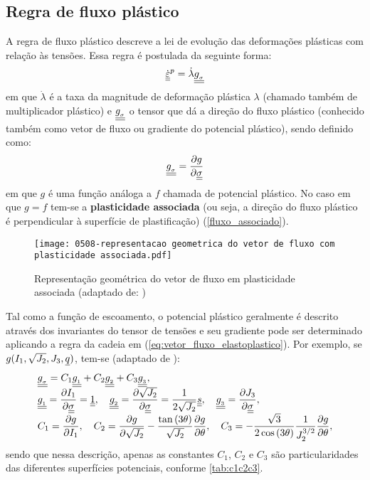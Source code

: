 \subsection{Regra de fluxo plástico}

A regra de fluxo plástico descreve a lei de evolução das deformações plásticas com relação às tensões. Essa regra é postulada da seguinte forma:
\begin{equation}
	\label{eq:fluxo_elastoplastico}
	\dot {\underline{\underline \varepsilon}}^p = \dot \lambda \underline{\underline {g_{_\sigma}}}
\end{equation}
em que $\dot \lambda$ é a taxa da magnitude de deformação plástica $\lambda$ (chamado também de multiplicador plástico) e $\underline{\underline {g_{_\sigma}}}$ o tensor que dá a direção do fluxo plástico (conhecido também como vetor de fluxo ou gradiente do potencial plástico), sendo definido como:
\begin{equation}
	\label{eq:vetor_fluxo_elastoplastico}
	\underline{\underline {g_{_\sigma}}} = \dfrac{\partial g}{\partial \underline{\underline \sigma}}
\end{equation}
em que $g$ é uma função análoga a $f$ chamada de potencial plástico. No caso em que $g=f$ tem-se a \textbf{plasticidade associada} (ou seja, a direção do fluxo plástico é perpendicular à superfície de plastificação) (\autoref{fluxo_associado}).
\begin{figure}[H]
	\begin{center}
		\texttt{[image: 0508-representacao geometrica do vetor de fluxo com plasticidade associada.pdf]}
	\end{center}
	\caption{\label{fluxo_associado}Representação geométrica do vetor de fluxo em plasticidade associada (adaptado de: )}
\end{figure}
Tal como a função de escoamento, o potencial plástico geralmente é descrito através dos invariantes do tensor de tensões e seu gradiente pode ser determinado aplicando a regra da cadeia em (\ref{eq:vetor_fluxo_elastoplastico}). Por exemplo, se $g(I_1,\sqrt{J_2},J_3,\underline q)$, tem-se (adaptado de ):
\begin{equation}
	\label{eq:invariantes_tensores}
	\begin{array}{lcl}
		\underline{\underline {g_{_\sigma}}} = C_1\underline{\underline {g_{_1}}} + C_2\underline{\underline {g_{_2}}} + C_3\underline{\underline {g_{_3}}}, \\ 
		\underline{\underline {g_{_1}}} = \dfrac{\partial I_1}{\partial \underline{\underline \sigma}} = \underline{\underline 1},~~~ \underline{\underline {g_{_2}}} = \dfrac{\partial \sqrt{J_2}}{\partial \underline{\underline \sigma}} = \dfrac{1}{2\sqrt{J_2}}\underline{\underline s},~~~ \underline{\underline {g_{_3}}} = \dfrac{\partial J_3}{\partial \underline{\underline \sigma}}, \\
		C_1 = \dfrac{\partial g}{\partial I_1},~~~C_2=\dfrac{\partial g}{\partial \sqrt{J_2}}-\dfrac{\tan{(3\theta)}}{\sqrt{J_2}}\dfrac{\partial g}{\partial \theta},~~~C_3 = -\dfrac{\sqrt{3}}{2\cos{(3\theta})}\dfrac{1}{J_2^{3/2}}\dfrac{\partial g}{\partial \theta},
	\end{array}
\end{equation}
sendo que nessa descrição, apenas as constantes $C_1$, $C_2$  e $C_3$ são particularidades das diferentes superfícies potenciais, conforme \autoref{tab:c1c2c3}. 

